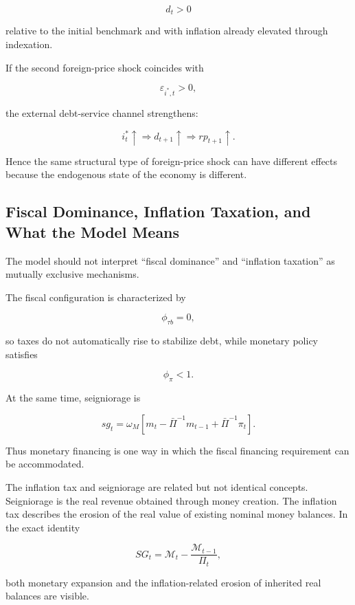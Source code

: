 \[
d_t>0
\]

relative to the initial benchmark and with inflation already elevated through
indexation.

If the second foreign-price shock coincides with

\[
\varepsilon_{i^{*},t}>0,
\]

the external debt-service channel strengthens:

\[
i_t^{*}\uparrow
\Rightarrow
d_{t+1}\uparrow
\Rightarrow
rp_{t+1}\uparrow.
\]

Hence the same structural type of foreign-price shock can have different
effects because the endogenous state of the economy is different.

\subsection{Fiscal Dominance, Inflation Taxation, and What the Model Means}
\label{app:fiscal_dominance}

The model should not interpret ``fiscal dominance'' and ``inflation taxation''
as mutually exclusive mechanisms.

The fiscal configuration is characterized by

\[
\phi_{\tau b}=0,
\]

so taxes do not automatically rise to stabilize debt, while monetary policy
satisfies

\[
\phi_\pi<1.
\]

At the same time, seigniorage is

\[
sg_t
=
\omega_M
\left[
m_t-\bar\Pi^{-1}m_{t-1}
+\bar\Pi^{-1}\pi_t
\right].
\]

Thus monetary financing is one way in which the fiscal financing requirement
can be accommodated.

The inflation tax and seigniorage are related but not identical concepts.
Seigniorage is the real revenue obtained through money creation. The inflation
tax describes the erosion of the real value of existing nominal money
balances. In the exact identity

\[
SG_t
=
\mathcal M_t-\frac{\mathcal M_{t-1}}{\Pi_t},
\]

both monetary expansion and the inflation-related erosion of inherited real
balances are visible.

